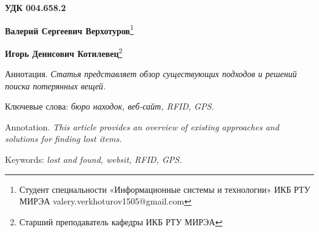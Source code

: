 \documentclass{mirea-article}
\begin{document}
	
	\textbf{УДК 004.658.2}
	
	\begin{FlushRight}
		\textbf{Валерий Сергеевич Верхотуров}\footnote{Студент специальности «Информационные системы и технологии» ИКБ РТУ МИРЭА valery.verkhoturov1505@gmail.com} 

		\textbf{Игорь Денисович Котилевец}\footnote{Старший преподаватель кафедры ИКБ РТУ МИРЭА} 
	\end{FlushRight}
	
	
	Аннотация. \textit{Статья представляет обзор существующих подходов и решений поиска потерянных вещей.}
	
	Ключевые слова: \textit{бюро находок, веб-сайт, RFID, GPS.}
	
	
	Annotation. \textit{This article provides an overview of existing approaches and solutions for finding lost items. }
	
	Keywords: \textit{lost and found, websit, RFID, GPS.}
	
\end{document}
